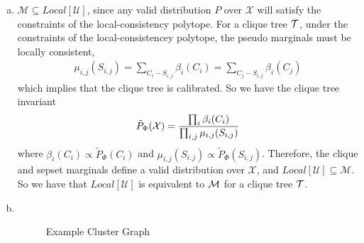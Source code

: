\documentclass{article}
\begin{document}
\begin{enumerate}[(a)]
    \item $\mathcal{M} \subseteq Local[\mathcal{U}]$, since any valid distribution $P$ over $\mathcal{X}$ will satisfy the constraints of the local-consistency polytope. For a clique tree $\cal{T}$, under the constraints of the local-consistencey polytope, the pseudo marginals must be locally consistent, \begin{align*}
        \mu_{i,j}(S_{i,j}) = \sum_{C_i - S_{i,j}}\beta_i(C_i) = \sum_{C_j - S_{i,j}}\beta_i(C_j)
    \end{align*}
    which implies that the clique tree is calibrated. So we have the clique tree invariant \begin{align*}
        \Tilde{P}_{\Phi}(\mathcal{X}) = \frac{\prod_i \beta_i (C_i)}{\prod_{i,j} \mu_{i,j}(S_{i,j})}
    \end{align*} where $\beta_i(C_i) \propto \tilde{P}_{\Phi}(C_i)$ and $\mu_{i,j}(S_{i,j}) \propto \tilde{P}_{\Phi}(S_{i,j})$. Therefore, the clique and sepset marginals define a valid distribution over $\mathcal{X}$, and $Local[\mathcal{U}] \subseteq \mathcal{M}$. So we have that $Local[\mathcal{U}]$ is equivalent to $\cal{M}$ for a clique tree $\cal{T}$.
    
    \item \textcolor{white}{{x}}
    \begin{figure}[th]
        \centering
        \caption{Example Cluster Graph}
        \label{fig:bethe-cluster-graph}
    \end{figure}


\end{enumerate}
\end{document}
